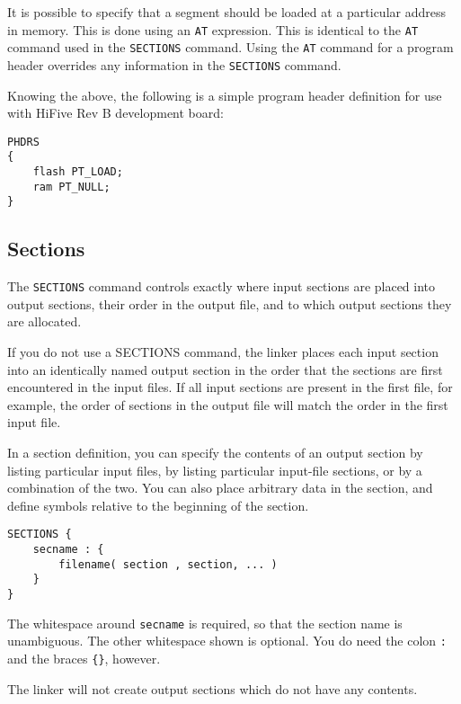 \documentclass[a4paper,12pt,twoside]{report}
\begin{document}
                It is possible to specify that a segment should be loaded at a particular address in memory. This is done using an \lstinline|AT| expression. This is identical to the \lstinline|AT| command used in the \lstinline|SECTIONS| command. Using the \lstinline|AT| command for a program header overrides any information in the \lstinline|SECTIONS| command.\cite{gnuldProgramHeaders}

                Knowing the above, the following is a simple program header definition for use with HiFive Rev B development board:
\begin{lstlisting}
PHDRS
{
    flash PT_LOAD;
    ram PT_NULL;
}
\end{lstlisting}

            \subsection{Sections}
                The \lstinline|SECTIONS| command controls exactly where input sections are placed into output sections, their order in the output file, and to which output sections they are allocated.\cite{gnuldOutputSections}

                If you do not use a SECTIONS command, the linker places each input section into an identically named output section in the order that the sections are first encountered in the input files. If all input sections are present in the first file, for example, the order of sections in the output file will match the order in the first input file.\cite{gnuldOutputSections}

                In a section definition, you can specify the contents of an output section by listing particular input files, by listing particular input-file sections, or by a combination of the two. You can also place arbitrary data in the section, and define symbols relative to the beginning of the section.\cite{gnuldOutputSections}
\begin{verbatim}
SECTIONS {
    secname : {
        filename( section , section, ... )
    }
}
\end{verbatim}
                The whitespace around \lstinline|secname| is required, so that the section name is unambiguous. The other whitespace shown is optional. You do need the colon \lstinline|:| and the braces \lstinline|{}|, however.\cite{gnuldOutputSections}

                The linker will not create output sections which do not have any contents.\cite{gnuldOutputSections}
\end{document}

